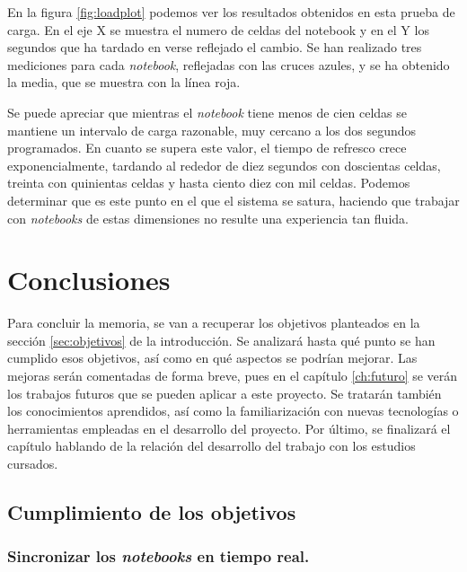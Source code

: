 \documentclass[11pt,spanish,listoffigures]{tfgetsinf}
\begin{document}
En la figura \ref{fig:loadplot} podemos ver los resultados obtenidos en esta prueba de carga. En el eje X se muestra el numero de celdas del notebook y en el Y los segundos que ha tardado en verse reflejado el cambio. Se han realizado tres mediciones para cada \textit{notebook}, reflejadas con las cruces azules, y se ha obtenido la media, que se muestra con la línea roja.

Se puede apreciar que mientras el \textit{notebook} tiene menos de cien celdas se mantiene un intervalo de carga razonable, muy cercano a los dos segundos programados. En cuanto se supera este valor, el tiempo de refresco crece exponencialmente, tardando al rededor de diez segundos con doscientas celdas, treinta con quinientas celdas y hasta ciento diez con mil celdas. Podemos determinar que es este punto en el que el sistema se satura, haciendo que trabajar con \textit{notebooks} de estas dimensiones no resulte una experiencia tan fluida.



\chapter{Conclusiones}
\label{ch:conclusiones}

Para concluir la memoria, se van a recuperar los objetivos planteados en la sección \ref{sec:objetivos} de la introducción. Se analizará hasta qué punto se han cumplido esos objetivos, así como en qué aspectos se podrían mejorar. Las mejoras serán comentadas de forma breve, pues en el capítulo \ref{ch:futuro} se verán los trabajos futuros que se pueden aplicar a este proyecto. Se tratarán también los conocimientos aprendidos, así como la familiarización con nuevas tecnologías o herramientas empleadas en el desarrollo del proyecto. Por último, se finalizará el capítulo hablando de la relación del desarrollo del trabajo con los estudios cursados.



\section{Cumplimiento de los objetivos}
\label{sec:conc-objetivos}

\subsection{Sincronizar los \textit{notebooks} en tiempo real.}
\label{subsec:objetivos-conc-sincro}
\end{document}
